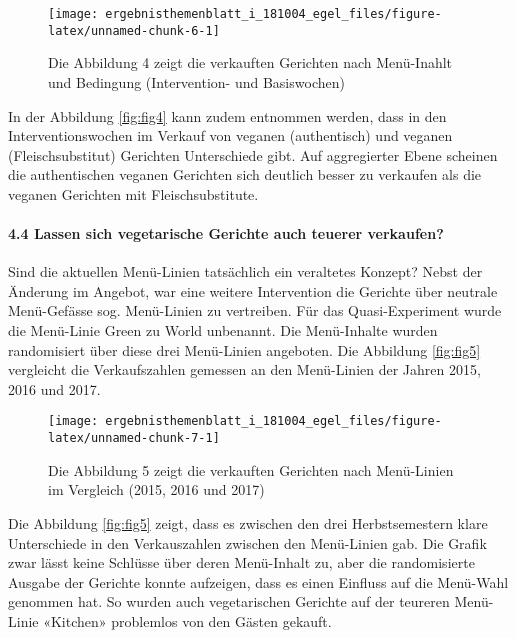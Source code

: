 \documentclass[12pt,ngerman,]{article}
\let\oldparagraph\paragraph
\renewcommand{\paragraph}[1]{\oldparagraph{#1}\mbox{}}
\begin{document}
\begin{figure}[H]

{\centering \texttt{[image: ergebnisthemenblatt\_i\_181004\_egel\_files/figure-latex/unnamed-chunk-6-1]} 

}

\caption{\label{fig:fig4} Die Abbildung 4 zeigt die verkauften Gerichten nach Menü-Inahlt und Bedingung (Intervention- und Basiswochen)}\label{fig:unnamed-chunk-6}
\end{figure}

In der Abbildung \ref{fig:fig4} kann zudem entnommen werden, dass in den
Interventionswochen im Verkauf von veganen (authentisch) und veganen
(Fleischsubstitut) Gerichten Unterschiede gibt. Auf aggregierter Ebene
scheinen die authentischen veganen Gerichten sich deutlich besser zu
verkaufen als die veganen Gerichten mit Fleischsubstitute.

\hypertarget{lassen-sich-vegetarische-gerichte-auch-teuerer-verkaufen}{%
\paragraph{4.4 Lassen sich vegetarische Gerichte auch teuerer
verkaufen?}\label{lassen-sich-vegetarische-gerichte-auch-teuerer-verkaufen}}

Sind die aktuellen Menü-Linien tatsächlich ein veraltetes Konzept? Nebst
der Änderung im Angebot, war eine weitere Intervention die Gerichte über
neutrale Menü-Gefässe sog. Menü-Linien zu vertreiben. Für das
Quasi-Experiment wurde die Menü-Linie Green zu World unbenannt. Die
Menü-Inhalte wurden randomisiert über diese drei Menü-Linien angeboten.
Die Abbildung \ref{fig:fig5} vergleicht die Verkaufszahlen gemessen an
den Menü-Linien der Jahren 2015, 2016 und 2017.

\begin{figure}[H]

{\centering \texttt{[image: ergebnisthemenblatt\_i\_181004\_egel\_files/figure-latex/unnamed-chunk-7-1]} 

}

\caption{\label{fig:fig5} Die Abbildung 5 zeigt die verkauften Gerichten nach Menü-Linien im Vergleich (2015, 2016 und 2017)}\label{fig:unnamed-chunk-7}
\end{figure}

Die Abbildung \ref {fig:fig5} zeigt, dass es zwischen den drei
Herbstsemestern klare Unterschiede in den Verkauszahlen zwischen den
Menü-Linien gab. Die Grafik zwar lässt keine Schlüsse über deren
Menü-Inhalt zu, aber die randomisierte Ausgabe der Gerichte konnte
aufzeigen, dass es einen Einfluss auf die Menü-Wahl genommen hat. So
wurden auch vegetarischen Gerichte auf der teureren Menü-Linie «Kitchen»
problemlos von den Gästen gekauft.
\end{document}
